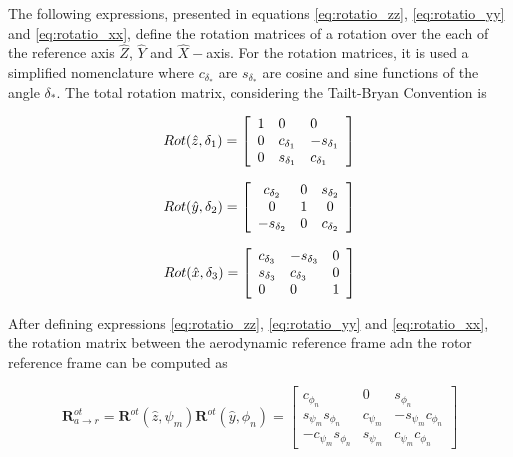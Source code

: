 The following expressions, presented in equations \ref{eq:rotatio_zz}, \ref{eq:rotatio_yy} and \ref{eq:rotatio_xx}, define the rotation matrices of a rotation over the each of the reference axis $\hat{Z}$, $\hat{Y}$ and $\hat{X}-$axis. For the rotation matrices, it is used a simplified nomenclature where $c_{\delta_{*}}$ are $s_{\delta_{*}}$ are cosine and sine functions of the angle $\delta_{*}$. The total rotation matrix, considering the Tailt-Bryan Convention is

\begin{equation}
    {R o t({\hat{z}},\delta_1)}={\left[\begin{array}{l l l}{1}&{0}&{0}\\ {0}&{c_{\delta_1}}&{-s_{\delta_1}}\\ {0}&{s_{\delta_1}}&{c_{\delta_1}}\end{array}\right]}
    \label{eq:rotatio_zz}
\end{equation}

\begin{equation}
    Rot(\hat{y},\delta_2)=\left[\begin{array}{c c c}{{c_{\delta_2}}}&{{0}}&{{s_{\delta_2}}}\\ {{0}}&{{1}}&{{0}}\\ {{-s_{\delta_2}}}&{{0}}&{{c_{\delta_2}}}\end{array}\right]
    \label{eq:rotatio_yy}
\end{equation}

\begin{equation}
    Rot({\hat{x}},{\delta_3})={\left[\begin{array}{l l l}{{{c}_{\delta_3}}}&{{-{s}_{\delta_3}}}&{{0}}\\ {{{s}_{\delta_3}}}&{{{c}_{\delta_3}}}&{{0}}\\ {{0}}&{{0}}&{{1}}\end{array}\right]}
        \label{eq:rotatio_xx} 
\end{equation}


After defining expressions \ref{eq:rotatio_zz}, \ref{eq:rotatio_yy} and \ref{eq:rotatio_xx}, the rotation matrix between the aerodynamic reference frame adn the rotor reference frame can be computed as

\begin{equation}
    \boldsymbol{R}^{ot}_{a \to r} = \boldsymbol{R}^{ot}(\hat{z}, \psi_m) \boldsymbol{R}^{ot}(\hat{y}, \phi_n) =
    \begin{bmatrix}
    c_{\phi_n} & 0 & s_{\phi_n} \\
    s_{\psi_m}s_{\phi_n} & c_{\psi_m} & -s_{\psi_m}c_{\phi_n} \\
    -c_{\psi_m}s_{\phi_n} & s_{\psi_m} & c_{\psi_m}c_{\phi_n}
    \end{bmatrix}    
    \label{eq:rotatio_aero_rotor}
\end{equation}


